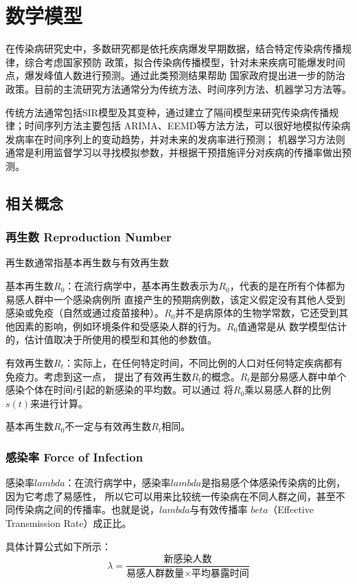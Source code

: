 \documentclass[bwprint]{gmcmthesis}
\numberwithin{figure}{section}
\begin{document}
\section{数学模型}
\par 在传染病研究史中，多数研究都是依托疾病爆发早期数据，结合特定传染病传播规律，综合考虑国家预防
政策，拟合传染病传播模型，针对未来疾病可能爆发时间点，爆发峰值人数进行预测。通过此类预测结果帮助
国家政府提出进一步的防治政策。目前的主流研究方法通常分为传统方法、时间序列方法、机器学习方法等。
\par 传统方法通常包括SIR模型及其变种，通过建立了隔间模型来研究传染病传播规律；时间序列方法主要包括
ARIMA、EEMD等方法方法，可以很好地模拟传染病发病率在时间序列上的变动趋势，并对未来的发病率进行预测；
机器学习方法则通常是利用监督学习以寻找模拟参数，并根据干预措施评分对疾病的传播率做出预测。

\subsection{相关概念}
\subsubsection{再生数 Reproduction Number}
再生数通常指基本再生数与有效再生数

\par 基本再生数$R_0$：在流行病学中，基本再生数表示为$R_0$，代表的是在所有个体都为易感人群中一个感染病例所
直接产生的预期病例数，该定义假定没有其他人受到感染或免疫（自然或通过疫苗接种）。$R_0$并不是病原体的生物学常数，它还受到其他因素的影响，例如环境条件和受感染人群的行为。$R_0$值通常是从
数学模型估计的，估计值取决于所使用的模型和其他的参数值。
\par 有效再生数$R_t$：实际上，在任何特定时间，不同比例的人口对任何特定疾病都有免疫力。考虑到这一点，
提出了有效再生数$R_t$的概念。$R_t$是部分易感人群中单个感染个体在时间$t$引起的新感染的平均数。可以通过
将$R_0$乘以易感人群的比例$s\left( t \right)$来进行计算。
\par 基本再生数$R_0$不一定与有效再生数$R_t$相同。

\subsubsection{感染率 Force of Infection}
\par 感染率$lambda$：在流行病学中，感染率$lambda$是指易感个体感染传染病的比例，因为它考虑了易感性，
所以它可以用来比较统一传染病在不同人群之间，甚至不同传染病之间的传播率。也就是说，$lambda$与有效传播率
$beta$（Effective Transmission Rate）成正比。
\par 具体计算公式如下所示：
\begin{equation} \label{}
    \lambda =\frac{\text{新感染人数}}{\text{易感人群数量}\times \text{平均暴露时间}}
\end{equation}
\end{document}
